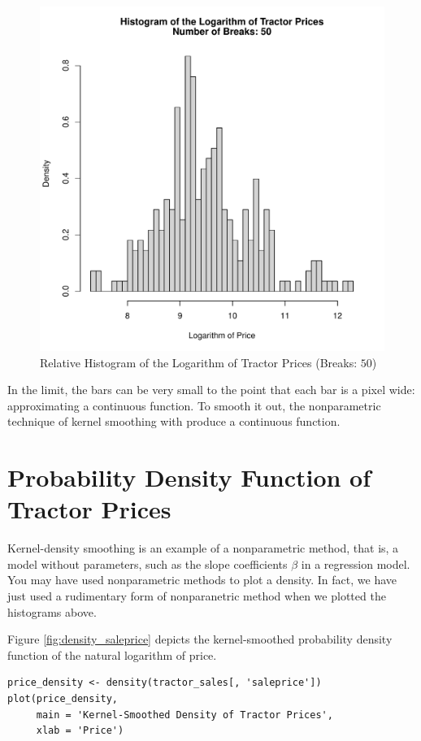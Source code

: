 \begin{figure}[h!]
  \centering
  \includegraphics[scale = 0.5, keepaspectratio=true]{../Figures/hist_log_saleprice_br50}
  \caption{Relative Histogram of the Logarithm of Tractor Prices (Breaks: $50$)} \label{fig:hist_log_saleprice_br50}
\end{figure}

\pagebreak
In the limit, the bars can be very small
to the point that each bar is a pixel wide:
approximating a continuous function.
To smooth it out, the nonparametric technique of
kernel smoothing with produce a continuous function.


\pagebreak
\section{Probability Density Function of Tractor Prices}

Kernel-density smoothing is an example of a nonparametric method,
that is, a model without parameters,
such as the slope coefficients $\beta$ in a regression model.
You may have used nonparametric methods to plot a density.
In fact, we have just used a rudimentary form of nonparanetric method
when we plotted the histograms above.


Figure \ref{fig:density_saleprice} depicts
the kernel-smoothed probability density function of the natural logarithm of
price.
\begin{verbatim}
price_density <- density(tractor_sales[, 'saleprice'])
plot(price_density,
     main = 'Kernel-Smoothed Density of Tractor Prices',
     xlab = 'Price')
\end{verbatim}


